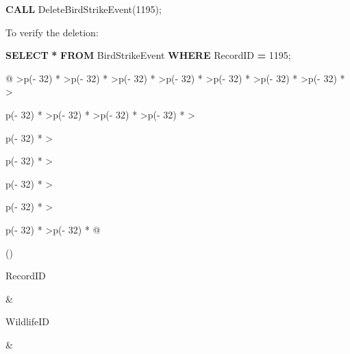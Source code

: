 \documentclass[
]{article}
\newenvironment{Shaded}{\begin{snugshade}}{\end{snugshade}}
\newcommand{\DecValTok}[1]{\textcolor[rgb]{0.00,0.00,0.81}{#1}}
\newcommand{\KeywordTok}[1]{\textcolor[rgb]{0.13,0.29,0.53}{\textbf{#1}}}
\newcommand{\NormalTok}[1]{#1}
\newcommand{\OperatorTok}[1]{\textcolor[rgb]{0.81,0.36,0.00}{\textbf{#1}}}
\begin{document}
\begin{Shaded}
\begin{Highlighting}[]
\KeywordTok{CALL}\NormalTok{ DeleteBirdStrikeEvent(}\DecValTok{1195}\NormalTok{);}
\end{Highlighting}
\end{Shaded}

To verify the deletion:

\begin{Shaded}
\begin{Highlighting}[]
\KeywordTok{SELECT} \OperatorTok{*} \KeywordTok{FROM}\NormalTok{ BirdStrikeEvent }\KeywordTok{WHERE}\NormalTok{ RecordID }\OperatorTok{=} \DecValTok{1195}\NormalTok{;}
\end{Highlighting}
\end{Shaded}

\begin{longtable}[]{@{}
  >{\raggedleft\arraybackslash}p{(\columnwidth - 32\tabcolsep) * }
  >{\raggedleft\arraybackslash}p{(\columnwidth - 32\tabcolsep) * }
  >{\raggedleft\arraybackslash}p{(\columnwidth - 32\tabcolsep) * }
  >{\raggedleft\arraybackslash}p{(\columnwidth - 32\tabcolsep) * }
  >{\raggedleft\arraybackslash}p{(\columnwidth - 32\tabcolsep) * }
  >{\raggedleft\arraybackslash}p{(\columnwidth - 32\tabcolsep) * }
  >{\raggedleft\arraybackslash}p{(\columnwidth - 32\tabcolsep) * }
  >{\raggedright\arraybackslash}p{(\columnwidth - 32\tabcolsep) * }
  >{\raggedleft\arraybackslash}p{(\columnwidth - 32\tabcolsep) * }
  >{\raggedleft\arraybackslash}p{(\columnwidth - 32\tabcolsep) * }
  >{\raggedleft\arraybackslash}p{(\columnwidth - 32\tabcolsep) * }
  >{\raggedright\arraybackslash}p{(\columnwidth - 32\tabcolsep) * }
  >{\raggedright\arraybackslash}p{(\columnwidth - 32\tabcolsep) * }
  >{\raggedright\arraybackslash}p{(\columnwidth - 32\tabcolsep) * }
  >{\raggedright\arraybackslash}p{(\columnwidth - 32\tabcolsep) * }
  >{\raggedright\arraybackslash}p{(\columnwidth - 32\tabcolsep) * }
  >{\raggedleft\arraybackslash}p{(\columnwidth - 32\tabcolsep) * }@{}}
\caption{0 records}\tabularnewline
\toprule()
\begin{minipage}[b]{\linewidth}\raggedleft
RecordID
\end{minipage} & \begin{minipage}[b]{\linewidth}\raggedleft
WildlifeID
\end{minipage} & \begin{minipage}[b]{\linewidth}\raggedleft

\end{minipage}
\end{longtable}
\end{document}
